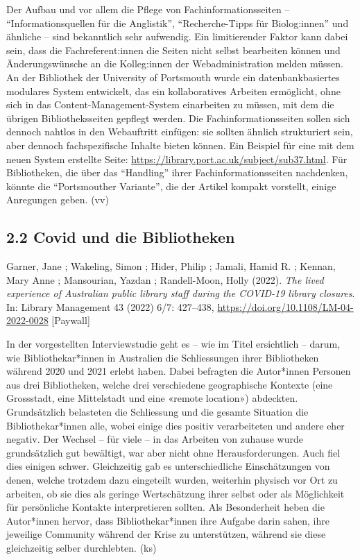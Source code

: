\documentclass[a4paper,
fontsize=11pt,
oneside,
numbers=noperiodatend,
parskip=half-,
bibliography=totoc,
final
]{scrartcl}
\begin{document}
Der Aufbau und vor allem die Pflege von Fachinformationsseiten --
\enquote{Informationsquellen für die Anglistik},
\enquote{Recherche-Tipps für Biolog:innen} und ähnliche -- sind
bekanntlich sehr aufwendig. Ein limitierender Faktor kann dabei sein,
dass die Fachreferent:innen die Seiten nicht selbst bearbeiten können
und Änderungswünsche an die Kolleg:innen der Webadministration melden
müssen. An der Bibliothek der University of Portsmouth wurde ein
datenbankbasiertes modulares System entwickelt, das ein kollaboratives
Arbeiten ermöglicht, ohne sich in das Content-Management-System
einarbeiten zu müssen, mit dem die übrigen Bibliotheksseiten gepflegt
werden. Die Fachinformationsseiten sollen sich dennoch nahtlos in den
Webauftritt einfügen: sie sollten ähnlich strukturiert sein, aber
dennoch fachspezifische Inhalte bieten können. Ein Beispiel für eine mit
dem neuen System erstellte Seite:
\url{https://library.port.ac.uk/subject/sub37.html}. Für Bibliotheken,
die über das \enquote{Handling} ihrer Fachinformationsseiten nachdenken,
könnte die \enquote{Portsmouther Variante}, die der Artikel kompakt
vorstellt, einige Anregungen geben. (vv)

\hypertarget{covid-und-die-bibliotheken}{%
\subsection{2.2 Covid und die
Bibliotheken}\label{covid-und-die-bibliotheken}}

Garner, Jane ; Wakeling, Simon ; Hider, Philip ; Jamali, Hamid R. ;
Kennan, Mary Anne ; Mansourian, Yazdan ; Randell-Moon, Holly (2022).
\emph{The lived experience of Australian public library staff during the
COVID-19 library closures}. In: Library Management 43 (2022) 6/7:
427--438, \url{https://doi.org/10.1108/LM-04-2022-0028} {[}Paywall{]}

In der vorgestellten Interviewstudie geht es -- wie im Titel ersichtlich
-- darum, wie Bibliothekar*innen in Australien die Schliessungen ihrer
Bibliotheken während 2020 und 2021 erlebt haben. Dabei befragten die
Autor*innen Personen aus drei Bibliotheken, welche drei verschiedene
geographische Kontexte (eine Grossstadt, eine Mittelstadt und eine
«remote location») abdeckten. Grundsätzlich belasteten die Schliessung
und die gesamte Situation die Bibliothekar*innen alle, wobei einige dies
positiv verarbeiteten und andere eher negativ. Der Wechsel -- für viele
-- in das Arbeiten von zuhause wurde grundsätzlich gut bewältigt, war
aber nicht ohne Herausforderungen. Auch fiel dies einigen schwer.
Gleichzeitig gab es unterschiedliche Einschätzungen von denen, welche
trotzdem dazu eingeteilt wurden, weiterhin physisch vor Ort zu arbeiten,
ob sie dies als geringe Wertschätzung ihrer selbst oder als Möglichkeit
für persönliche Kontakte interpretieren sollten. Als Besonderheit heben
die Autor*innen hervor, dass Bibliothekar*innen ihre Aufgabe darin
sahen, ihre jeweilige Community während der Krise zu unterstützen,
während sie diese gleichzeitig selber durchlebten. (ks)
\end{document}
